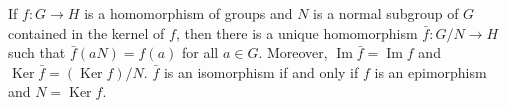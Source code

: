 \begin{theorem}
If $f: G \rightarrow H$ is a homomorphism of groups and $N$ is a normal subgroup of $G$ contained in the kernel of $f$, then there is a unique homomorphism $\bar{f}: G/N \rightarrow H$ such that $\bar{f}(aN) = f(a)$ for all $a \in G$. Moreover, $\operatorname{Im} \bar{f} = \operatorname{Im} f$ and $\operatorname{Ker} \bar{f} = (\operatorname{Ker} f)/N$. $\bar{f}$ is an isomorphism if and only if $f$ is an epimorphism and $N = \operatorname{Ker} f$.
\end{theorem}
